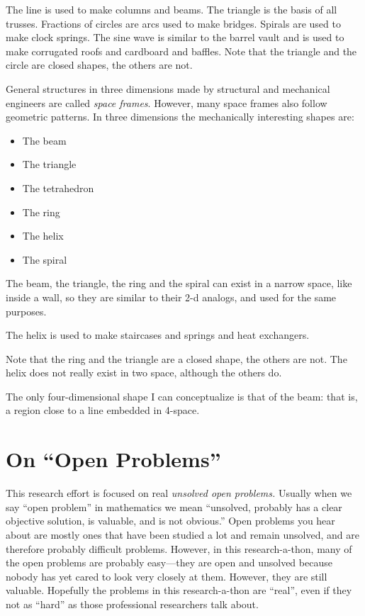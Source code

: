 \documentclass[11pt]{article}
\begin{document}
The line is used to make columns and beams. The triangle is the basis of all trusses.
Fractions of circles are arcs used to make bridges. Spirals are used to make clock springs.
The sine wave is similar to the barrel vault and is used to make corrugated roofs and cardboard
and baffles.
Note that the triangle and the circle are closed shapes, the others are not.

General structures in three dimensions made by structural and mechanical engineers are
called {\em space frames}. However, many space frames also follow geometric patterns.
In three dimensions the mechanically interesting shapes are:
\begin{itemize}
\item The beam
\item The triangle
\item The tetrahedron
\item The ring
\item The helix
\item The spiral
\end{itemize}

The beam, the triangle, the ring and the spiral can exist in a narrow space, like inside a wall,
so they are similar to their 2-d analogs, and used for the same purposes.

The helix is used to make staircases and springs and heat exchangers.

Note that the ring and the triangle are a closed shape, the others are not.
The helix does not really exist in two space, although the others do.

The only four-dimensional shape I can conceptualize is that of the
beam: that is, a region close to a line embedded in 4-space.

\section{On ``Open Problems''}

This research effort is focused on real {\em unsolved open problems.}
Usually when we say ``open problem'' in mathematics we mean ``unsolved, probably has a clear objective solution, is valuable,
and is not obvious.''
Open problems you hear about are mostly ones that have been studied a lot and remain unsolved, and are therefore probably difficult problems.
However, in this research-a-thon, many of the open problems are probably easy---they are open and unsolved because nobody has yet
cared to look very closely at them.  However, they are still valuable. Hopefully the problems in this research-a-thon are ``real'', even if they
not as ``hard'' as those professional researchers talk about.
\end{document}
